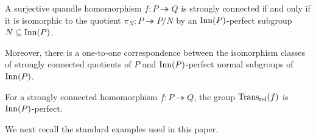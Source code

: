 \begin{thm}
\label{theorem: characterization of strongly connected via perfect subgroup}
    A surjective quandle homomorphism $f\colon P\twoheadrightarrow Q$ is strongly connected if and only if it is isomorphic to the quotient $\pi_N\colon P\twoheadrightarrow P/N$ by an $\operatorname{Inn}(P)$-perfect subgroup $N\subseteq \operatorname{Inn}(P)$.

    Moreover, there is a one-to-one correspondence between the isomorphism classes of strongly connected quotients of $P$ and $\operatorname{Inn}(P)$-perfect normal subgroups of $\operatorname{Inn}(P)$.
\end{thm}

\begin{cor}
\label{proposition:relTrans_of_strongly_conncted_is_Inn-perfect}
    For a strongly connected homomorphism $f\colon P\twoheadrightarrow Q$, the group $\operatorname{Trans_{rel}}(f)$ is $\operatorname{Inn}(P)$-perfect.
\end{cor}



We next recall the standard examples used in this paper.



